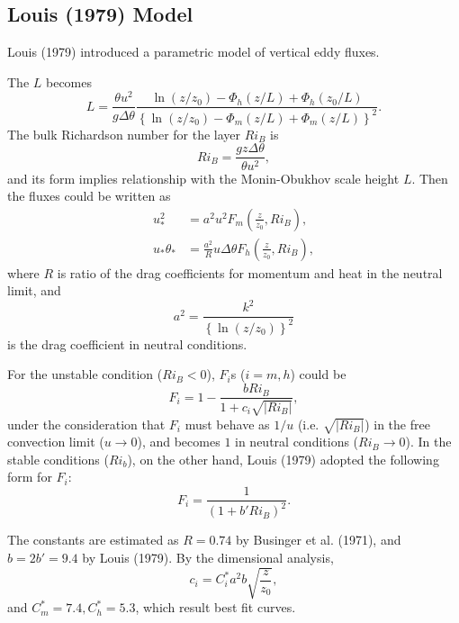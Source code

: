 \subsection{Louis (1979) Model}
Louis (1979) introduced a parametric model of vertical eddy fluxes.

The $L$ becomes
\begin{equation}
  L = \frac{\theta u^2}{g\Delta\theta}
    \frac{\ln(z/z_0)-\Phi_h(z/L)+\Phi_h(z_0/L)}{\left\{\ln(z/z_0)-\Phi_m(z/L)+\Phi_m(z/L)\right\}^2}.
\end{equation}
The bulk Richardson number for the layer $Ri_B$ is
\begin{equation}
  Ri_B = \frac{gz\Delta\theta}{\theta u^2},
\end{equation}
and its form implies relationship with the Monin-Obukhov scale height $L$.
Then the fluxes could be written as
\begin{align}
  u_*^2 &= a^2 u^2 F_m\left(\frac{z}{z_0},Ri_B\right), \label{eq: u_*^2} \\
  u_*\theta_* &= \frac{a^2}{R} u \Delta \theta F_h\left(\frac{z}{z_0},Ri_B\right), \label{eq: u_*t_*}
\end{align}
where
$R$ is ratio of the drag coefficients for momentum and heat in the neutral limit, and
\begin{equation}
  a^2 = \frac{k^2}{\left\{\ln\left(z/z_0\right)\right\}^2}
\end{equation}
is the drag coefficient in neutral conditions.

For the unstable condition ($Ri_B<0$),
$F_i$s ($i=m,h$) could be
\begin{equation}
  F_i = 1 - \frac{b Ri_B}{1 + c_i \sqrt{|Ri_B|}},
  \label{eq: F_i unstable}
\end{equation}
under the consideration that
$F_i$ must behave as $1/u$ (i.e. $\sqrt{|Ri_B|}$) in the free convection limit ($u \to 0$),
and becomes $1$ in neutral conditions ($Ri_B \to 0$).
In the stable conditions ($Ri_b$), on the other hand,
Louis (1979) adopted the following form for $F_i$:
\begin{equation}
  F_i = \frac{1}{(1 + b' Ri_B)^2}.
  \label{eq: F_i stable}
\end{equation}

The constants are estimated as
$R=0.74$ by Businger et al. (1971),
and $b=2b'=9.4$ by Louis (1979).
By the dimensional analysis,
\begin{equation}
  c_i = C^*_i a^2 b \sqrt{\frac{z}{z_0}},
\end{equation}
and $C^*_m = 7.4, C^*_h = 5.3$, which result best fit curves.


